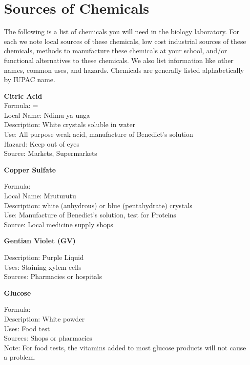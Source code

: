 \chapter{Sources of Chemicals}

The following is a list of chemicals you will need in the biology laboratory. For each we note local sources of these chemicals, low cost industrial sources of
these chemicals, methods to manufacture these chemicals at your school, and/or functional alternatives to these chemicals. We also list information like other names, common uses, and hazards. 
Chemicals are generally listed alphabetically by IUPAC name.

\begin{flushleft}
\textbf{Citric Acid}\\
Formula:  = \\
Local Name: Ndimu ya unga\\
Description: White crystals soluble in water\\
Use: All purpose weak acid, manufacture of Benedict's solution\\
Hazard: Keep out of eyes\\
Source: Markets, Supermarkets\\
\end{flushleft}


\begin{flushleft}
\textbf{Copper Sulfate}
\end{flushleft}
\vspace{-10pt}
Formula: \\
Local Name: Mruturutu\\
Description: white (anhydrous) or blue (pentahydrate) crystals\\
Use: Manufacture of Benedict's solution, test for Proteins\\
Source: Local medicine supply shops\\

\begin{flushleft}
\textbf{Gentian Violet (GV)}
\end{flushleft}
\vspace{-10pt}
Description: Purple Liquid\\
Uses: Staining xylem cells\\
Sources: Pharmacies or hospitals\\

\begin{flushleft}
\textbf{Glucose}
\end{flushleft}
\vspace{-10pt}
Formula: \\
Description: White powder\\
Uses: Food test\\
Sources: Shops or pharmacies\\
Note: For food tests, the vitamins added to most glucose products will not cause
a problem.

